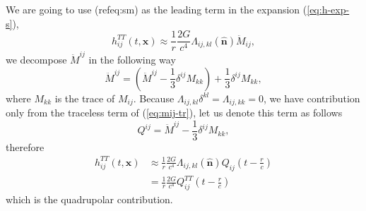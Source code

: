 We are going to use (ref{eq:sm}) as the leading term in the expansion
(\ref{eq:h-exp-s}),
\[
h_{ij}^{TT}\left(t,\boldsymbol{x}\right)\approx\frac{1}{r}\frac{2G}{c^{4}}\Lambda_{ij,kl}\left(\hat{\boldsymbol{n}}\right)\ddot{M}_{ij},
\]
we decompose $\ddot{M}^{ij}$ in the following way
\begin{equation}
\ddot{M}^{ij}=\left(\ddot{M}^{ij}-\frac{1}{3}\delta^{ij}M_{kk}\right)+\frac{1}{3}\delta^{ij}M_{kk},\label{eq:mij-tr}
\end{equation}
where $M_{kk}$ is the trace of $M_{ij}$. Because $\Lambda_{ij,kl}\delta^{kl}=\Lambda_{ij,kk}=0$,
we have contribution only from the traceless term of (\ref{eq:mij-tr}),
let us denote this term as follows
\[
Q^{ij}=\ddot{M}^{ij}-\frac{1}{3}\delta^{ij}M_{kk},
\]
therefore
\begin{align*}
h_{ij}^{TT}\left(t,\boldsymbol{x}\right) & \approx\frac{1}{r}\frac{2G}{c^{4}}\Lambda_{ij,kl}\left(\hat{\boldsymbol{n}}\right)Q_{ij}\left(t-\frac{r}{c}\right)\\
\  & =\frac{1}{r}\frac{2G}{c^{4}}Q_{ij}^{TT}\left(t-\frac{r}{c}\right)
\end{align*}
which is the quadrupolar contribution.
